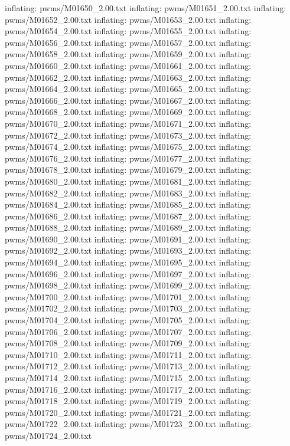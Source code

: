 \documentclass[letterpaper,10pt,english]{sphinxmanual}
\begin{document}
{\begin{sphinxVerbatim}[commandchars=\\\{\}]
  inflating: pwms/M01650\_2.00.txt
  inflating: pwms/M01651\_2.00.txt
  inflating: pwms/M01652\_2.00.txt
  inflating: pwms/M01653\_2.00.txt
  inflating: pwms/M01654\_2.00.txt
  inflating: pwms/M01655\_2.00.txt
  inflating: pwms/M01656\_2.00.txt
  inflating: pwms/M01657\_2.00.txt
  inflating: pwms/M01658\_2.00.txt
  inflating: pwms/M01659\_2.00.txt
  inflating: pwms/M01660\_2.00.txt
  inflating: pwms/M01661\_2.00.txt
  inflating: pwms/M01662\_2.00.txt
  inflating: pwms/M01663\_2.00.txt
  inflating: pwms/M01664\_2.00.txt
  inflating: pwms/M01665\_2.00.txt
  inflating: pwms/M01666\_2.00.txt
  inflating: pwms/M01667\_2.00.txt
  inflating: pwms/M01668\_2.00.txt
  inflating: pwms/M01669\_2.00.txt
  inflating: pwms/M01670\_2.00.txt
  inflating: pwms/M01671\_2.00.txt
  inflating: pwms/M01672\_2.00.txt
  inflating: pwms/M01673\_2.00.txt
  inflating: pwms/M01674\_2.00.txt
  inflating: pwms/M01675\_2.00.txt
  inflating: pwms/M01676\_2.00.txt
  inflating: pwms/M01677\_2.00.txt
  inflating: pwms/M01678\_2.00.txt
  inflating: pwms/M01679\_2.00.txt
  inflating: pwms/M01680\_2.00.txt
  inflating: pwms/M01681\_2.00.txt
  inflating: pwms/M01682\_2.00.txt
  inflating: pwms/M01683\_2.00.txt
  inflating: pwms/M01684\_2.00.txt
  inflating: pwms/M01685\_2.00.txt
  inflating: pwms/M01686\_2.00.txt
  inflating: pwms/M01687\_2.00.txt
  inflating: pwms/M01688\_2.00.txt
  inflating: pwms/M01689\_2.00.txt
  inflating: pwms/M01690\_2.00.txt
  inflating: pwms/M01691\_2.00.txt
  inflating: pwms/M01692\_2.00.txt
  inflating: pwms/M01693\_2.00.txt
  inflating: pwms/M01694\_2.00.txt
  inflating: pwms/M01695\_2.00.txt
  inflating: pwms/M01696\_2.00.txt
  inflating: pwms/M01697\_2.00.txt
  inflating: pwms/M01698\_2.00.txt
  inflating: pwms/M01699\_2.00.txt
  inflating: pwms/M01700\_2.00.txt
  inflating: pwms/M01701\_2.00.txt
  inflating: pwms/M01702\_2.00.txt
  inflating: pwms/M01703\_2.00.txt
  inflating: pwms/M01704\_2.00.txt
  inflating: pwms/M01705\_2.00.txt
  inflating: pwms/M01706\_2.00.txt
  inflating: pwms/M01707\_2.00.txt
  inflating: pwms/M01708\_2.00.txt
  inflating: pwms/M01709\_2.00.txt
  inflating: pwms/M01710\_2.00.txt
  inflating: pwms/M01711\_2.00.txt
  inflating: pwms/M01712\_2.00.txt
  inflating: pwms/M01713\_2.00.txt
  inflating: pwms/M01714\_2.00.txt
  inflating: pwms/M01715\_2.00.txt
  inflating: pwms/M01716\_2.00.txt
  inflating: pwms/M01717\_2.00.txt
  inflating: pwms/M01718\_2.00.txt
  inflating: pwms/M01719\_2.00.txt
  inflating: pwms/M01720\_2.00.txt
  inflating: pwms/M01721\_2.00.txt
  inflating: pwms/M01722\_2.00.txt
  inflating: pwms/M01723\_2.00.txt
  inflating: pwms/M01724\_2.00.txt

\end{sphinxVerbatim}}
\end{document}
